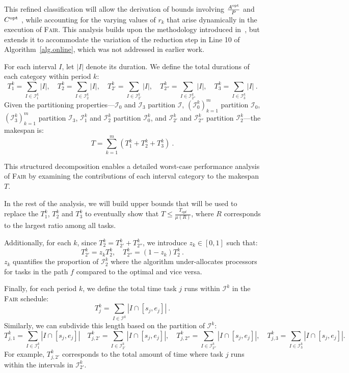 \documentclass{article}
\newcommand\ratio{R\xspace}
\newcommand\rratio{r\xspace}
\newcommand\opt{\textnormal{opt}\xspace}
\begin{document}
This refined classification will allow the derivation of bounds involving $\frac{A^{\opt}}{P}$ and $C^{\opt}$ , while accounting for the varying values of \( \rratio_k \) that arise dynamically in the execution of \textsc{Fair}. This analysis builds upon the methodology introduced in~\cite{TOPC24}, but extends it to accommodate the variation of the reduction step in Line 10 of Algorithm~\ref{alg.online}, which was not addressed in earlier work.

\vspace{0.3cm}

For each interval $I$, let $|I|$ denote its duration. We define the total durations of each category within period $k$:
\[
T_1^k = \sum_{I \in \mathcal{I}_1^k} |I|, \quad T_2^k = \sum_{I \in \mathcal{I}_2^k} |I|, \quad T_{2'}^k = \sum_{I \in \mathcal{I}_{2'}^k} |I|, \quad T_{2''}^k = \sum_{I \in \mathcal{I}_{2''}^k} |I|, \quad T_3^k = \sum_{I \in \mathcal{I}_3^k} |I|\ .
\]
Given the partitioning properties—$\mathcal{I}_0$ and $\mathcal{I}_3$ partition $\mathcal{I}$, $(\mathcal{I}_0^k)_{k=1}^m$ partition $\mathcal{I}_0$, $(\mathcal{I}_3^k)_{k=1}^m$ partition $\mathcal{I}_3$, $\mathcal{I}_1^k$ and $\mathcal{I}_2^k$ partition $\mathcal{I}_0^k$, and $\mathcal{I}_{2'}^k$ and $\mathcal{I}_{2''}^k$ partition $\mathcal{I}_2^k$—the makespan is:
\[
T = \sum_{k=1}^m (T_1^k + T_2^k + T_3^k)\ .
\]

This structured decomposition enables a detailed worst-case performance analysis of \textsc{Fair} by examining the contributions of each interval category to the makespan $T$.

In the rest of the analysis, we will build upper bounds that will be used to replace the $T_1^k$, $T_2^k$ and $T_3^k$ to eventually show that $T \leq \frac{T_{opt}}{\mu(\ratio)}$, where $\ratio$ corresponds to the largest ratio among all tasks.

Additionally, for each $k$, since $T_2^k = T_{2'}^k + T_{2''}^k$, we introduce $z_k \in [0,1]$ such that:
\begin{equation}
\label{eq.zk}
T_{2'}^k = z_k T_2^k, \quad T_{2''}^k = (1 - z_k) T_2^k\ .
\end{equation}
$z_k$ quantifies the proportion of $\mathcal{I}_2^k$ where the algorithm under-allocates processors for tasks in the path $f$ compared to the optimal and vice versa.

Finally, for each period \( k \), we define the total time task \( j \) runs within \( \mathcal{I}^{k} \) in the \textsc{Fair} schedule: \[ T_{j}^{k} = \sum_{I \in \mathcal{I}^{k}} |I \cap [s_j, e_j]|\ . \] Similarly, we can subdivide this length based on the partition of $\mathcal{I}^{k}$:
\[
T_{j,1}^{k} = \sum_{I \in \mathcal{I}_{1}^{k}} |I \cap [s_j, e_j]|
\quad T_{j,2'}^{k} = \sum_{I \in \mathcal{I}_{2'}^{k}} |I \cap [s_j, e_j]|,\quad
T_{j,2''}^{k} = \sum_{I \in \mathcal{I}_{2''}^{k}} |I \cap [s_j, e_j]|,\quad
T_{j,3}^{k} = \sum_{I \in \mathcal{I}_{3}^{k}} |I \cap [s_j, e_j]|.
\]
For example, \(T_{j,2'}^{k}\) corresponds to the total amount of time where task \(j\) runs within the intervals in \(\mathcal{I}_{2'}^{k}\).
\medskip
\end{document}
